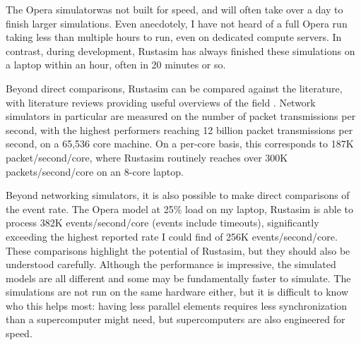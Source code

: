 The Opera simulator\opera was not built for speed, and will often take over a day to finish larger simulations. %
Even anecdotely, I have not heard of a full Opera run taking less than multiple hours to run, even on dedicated compute servers.
In contrast, during development, Rustasim has always finished these simulations on a laptop within an hour, often in 20 minutes or so.

Beyond direct comparisons, Rustasim can be compared against the literature, with literature reviews providing useful overviews of the field \cite{fujimoto_computational_2017}.
Network simulators in particular are measured on the number of packet transmissions per second, with the highest performers reaching 12 billion packet transmissions per second, on a 65,536 core machine.
On a per-core basis, this corresponds to 187K packet/second/core, where Rustasim routinely reaches over 300K packets/second/core on an 8-core laptop. %

Beyond networking simulators, it is also possible to make direct comparisons of the event rate.
The Opera model at 25\% load on my laptop, Rustasim is able to process 382K events/second/core (events include timeouts), significantly exceeding the highest reported rate I could find of 256K events/second/core\cite{barnes_warp_2013}.%
\\

These comparisons highlight the potential of Rustasim, but they should also be understood carefully.
Although the performance is impressive, the simulated models are all different and some may be fundamentally faster to simulate.
The simulations are not run on the same hardware either, but it is difficult to know who this helps most: having less parallel elements requires less synchronization than a supercomputer might need, but supercomputers are also engineered for speed.
